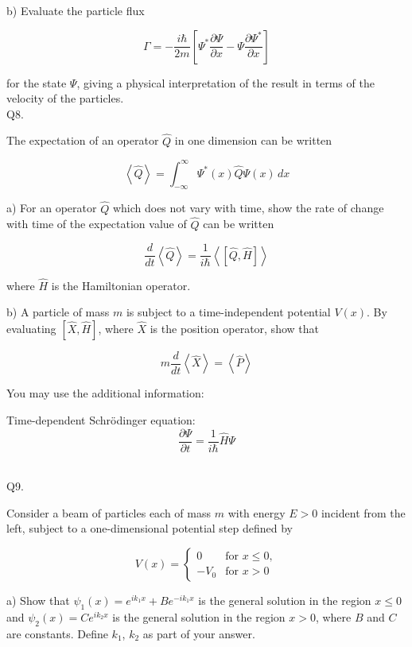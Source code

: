 \documentclass[a4paper,11pt]{article}
\begin{document}
\medskip

\noindent b) Evaluate the particle flux 

\[ \Gamma = -\frac{i\hbar}{2m}\left[ \Psi^{*}\frac{\partial\Psi}{\partial x} - \Psi\frac{\partial\Psi^{*}}{\partial x} \right] \]

\noindent for the state \( \Psi \), giving a physical interpretation of the result in terms of the velocity of the particles. \\

\noindent Q8.


\noindent The expectation of an operator \( \hat{Q} \) in one dimension can be written 

\[ \left< \hat{Q} \right> = \int_{-\infty}^{\infty} \Psi^{*}(x) \hat{Q} \Psi(x) \, dx \]

\medskip

\noindent a) For an operator \( \hat{Q} \) which does not vary with time, show the rate of change with time of the expectation value of \( \hat{Q} \) can be written

\[ \frac{d}{dt}\left<\hat{Q}\right> = \frac{1}{i\hbar}\left< \left[ \hat{Q}, \hat{H} \right] \right> \]

\noindent where \( \hat{H} \) is the Hamiltonian operator.  

\medskip

\noindent b) A particle of mass \( m \) is subject to a time-independent potential \( V(x) \). By evaluating \( \left[ \hat{X}, \hat{H}\right] \), where \( \hat{X} \) is the position operator, show that 

\[ m\frac{d}{dt}\left<\hat{X}\right> = \left<\hat{P}\right> \]

\noindent You may use the additional information: 

\noindent Time-dependent Schrödinger equation:
\[ \frac{\partial\Psi}{\partial t} = \frac{1}{i\hbar}\hat{H}\Psi \] \\

\medskip

\noindent Q9. 

\noindent Consider a beam of particles each of mass \( m \) with energy \( E > 0 \) incident from the left, subject to a one-dimensional potential step defined by

\[ V(x) = \begin{cases}
0 & \text{for } x \leq 0,\\
-V_{0}  & \text{for } x > 0 
\end{cases} \]

\noindent a) Show that \( \psi_{1}(x) = e^{ik_{1}x} + Be^{-ik_{1}x} \) is the general solution in the region \( x \leq 0 \) and \( \psi_{2}(x) = Ce^{ik_{2}x} \) is the general solution in the region \( x > 0 \), where \( B \) and \( C \) are constants. Define \( k_{1} \), \( k_{2} \) as part of your answer.
\end{document}
